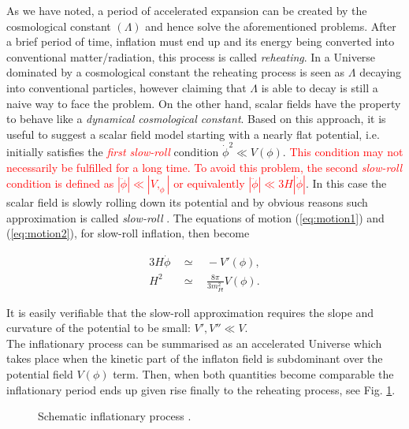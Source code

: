 \documentclass{rmaa}
\def\bea{\begin{eqnarray}}
\def\eea{\end{eqnarray}}
\begin{document}
As we have noted, a period of accelerated expansion can be created by 
the cosmological constant $(\Lambda)$ and hence solve the aforementioned problems.
After a brief period of time, inflation must end up and its energy being converted into conventional
matter/radiation, this process is called \textit{reheating}. In a Universe dominated by a 
cosmological constant the reheating process is seen as $\Lambda$ decaying into 
conventional particles, however claiming that $\Lambda$ is able to decay is still a 
naive way to face the problem.   
%
On the other hand, scalar fields have the property to behave like a 
\textit{dynamical cosmological constant}. Based on this approach, it is useful to
suggest a scalar field model starting with a nearly flat potential, i.e. initially 
satisfies the \textcolor{red}{\textit{first slow-roll}} condition $\dot \phi^2 \ll V(\phi)$. 
\textcolor{red}{This condition may not necessarily be fulfilled for a long time.
To avoid this problem, the second \textit{slow-roll} condition is defined as 
$|\ddot{\phi}|\ll |V,_{\phi}|$ or equivalently $|\ddot{\phi}|\ll 3H|\dot{\phi}|$}. In this case the scalar field is slowly rolling 
down its potential and by obvious reasons such approximation is called \textit{slow-roll} 
\citep{Liddle92, Liddle94}.
The equations of motion (\ref{eq:motion1}) 
 and (\ref{eq:motion2}), for slow-roll inflation, then become
 
\bea \label{eq:slow}
3H\dot{\phi} ~~ &\simeq& ~~ -V'(\phi), \\
H^2 ~~ & \simeq& ~~ \frac{8\pi}{3m^2_{Pl}} V(\phi). \label{eq:slow2}
\eea

\noindent
It is easily verifiable that the slow-roll approximation requires the slope 
and curvature of the potential to be small: $V', V'' \ll V$.
\\

The inflationary process can be summarised as an accelerated Universe which takes place when 
the kinetic part of the inflaton field is subdominant over the potential field $V(\phi)$ term. 
Then, when both quantities become comparable the inflationary period ends up given 
rise finally to the reheating process, see Fig. \ref{fig:Field}. 


\begin{figure}[ht] 
\centerline{ \epsfxsize=180pt  }
\caption{Schematic inflationary process \citep{Baumann}.}
\label{fig:Field}
\end{figure}
\end{document}
